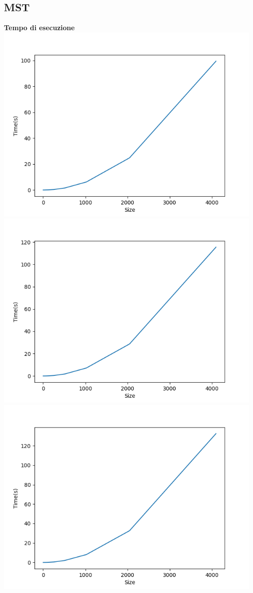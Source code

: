 \documentclass[]{article}
\begin{document}
\subsection{MST}
\textbf{Tempo di esecuzione}\\
\includegraphics[scale=0.5]{krusk_time_p=02.png}
\includegraphics[scale=0.5]{krusk_time_p=04.png}\\
\includegraphics[scale=0.5]{krusk_time_p=06.png}
\end{document}
